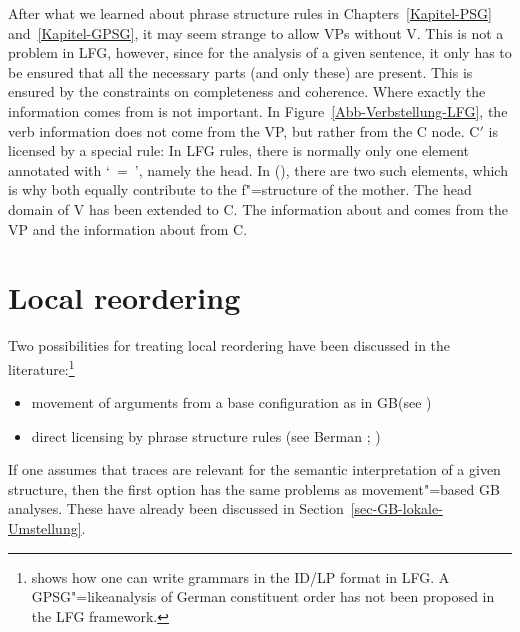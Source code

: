 {%
\noindent
After what we learned about phrase structure rules in Chapters~\ref{Kapitel-PSG} and~\ref{Kapitel-GPSG}, it may seem strange to allow VPs without V. This is not a problem in LFG,
however, since for the analysis of a given sentence, it only has to be ensured that all the necessary parts (and only these) are present. This is ensured by the constraints on 
completeness and coherence. Where exactly the information comes from is not important. In Figure~\ref{Abb-Verbstellung-LFG}, the verb information
does not come from the VP, but rather from the C node.
C$'$ is licensed by a special rule:
\ea
{}
\z
In LFG rules, there is normally only one element annotated with `\up~=~\down', namely the head. In (), there are two such elements, which is why both equally contribute to the
f"=structure of the mother. The head domain of V has been extended to C. The information about \lfgsubj and \lfgobj comes from the VP and the information about \pred from C.%

\section{Local reordering}
\label{Abschnitt-LFG-Umstellung}

Two possibilities for treating local reordering have been discussed in the literature:\footnote{%
  \citet[--21]{Kaplan95a} shows how one can write grammars in the ID/LP format in LFG. A GPSG"=like\indexgpsg analysis of German constituent
  order has not been proposed in the LFG framework.%
}
\begin{itemize}
\item movement of arguments from a base configuration as in GB\indexgb (see \citealp{Choi99a-u})
\item direct licensing by phrase structure rules (see Berman \citeyear[Section~2.1.3.1]{Berman96a-u}; \citeyear{Berman2003a})
\end{itemize}

\noindent
If one assumes that traces are relevant for the semantic interpretation of a given structure, then the first option has the same problems as movement"=based GB analyses.
These have already been discussed in Section~\ref{sec-GB-lokale-Umstellung}.

}
